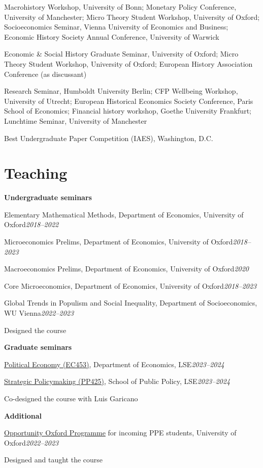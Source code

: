 \documentclass[10pt,a4paper]{article}
\newcommand{\pentry}[2]{#1\hfill\textit{#2}\par}
\newcommand{\papernote}[1]{\hspace*{1.6em}#1\par}
\newcommand{\presyear}[2]{\par\noindent\hangindent=2.1cm\hangafter=1 \makebox[2.1cm][l]{\textbf{#1}}#2\par}
\newcommand{\papergap}{\par\addvspace{8pt}}
\begin{document}
\presyear{2021}{Macrohistory Workshop, University of Bonn; Monetary Policy Conference, University of Manchester; Micro Theory Student Workshop, University of Oxford; Socioeconomics Seminar, Vienna University of Economics and Business; Economic History Society Annual Conference, University of Warwick}

\presyear{2020}{Economic \& Social History Graduate Seminar, University of Oxford; Micro Theory Student Workshop, University of Oxford; European History Association Conference (as discussant)}

\presyear{2019}{Research Seminar, Humboldt University Berlin; CFP Wellbeing Workshop, University of Utrecht; European Historical Economics Society Conference, Paris School of Economics; Financial history workshop, Goethe University Frankfurt; Lunchtime Seminar, University of Manchester}

\presyear{2016}{Best Undergraduate Paper Competition (IAES), Washington, D.C.}

\section{Teaching}

\textbf{Undergraduate seminars}\par
\pentry{Elementary Mathematical Methods, Department of Economics, University of Oxford}{2018--2022}
\pentry{Microeconomics Prelims, Department of Economics, University of Oxford}{2018--2023}
\pentry{Macroeconomics Prelims, Department of Economics, University of Oxford}{2020}
\pentry{Core Microeconomics, Department of Economics, University of Oxford}{2018--2023}
\pentry{Global Trends in Populism and Social Inequality, Department of Socioeconomics, WU Vienna}{2022--2023}
\papernote{Designed the course}
\papergap

\textbf{Graduate seminars}\par
\pentry{\href{https://www.lse.ac.uk/resources/calendar2023-2024/courseGuides/EC/2023_EC453.htm}{Political Economy (EC453)}, Department of Economics, LSE}{2023--2024}
\pentry{\href{https://www.lse.ac.uk/resources/calendar2023-2024/courseGuides/PP/2023_PP425.htm}{Strategic Policymaking (PP425)}, School of Public Policy, LSE}{2023--2024}
\papernote{Co-designed the course with Luis Garicano}
\papergap

\textbf{Additional}\par
\pentry{\href{https://www.ox.ac.uk/admissions/undergraduate/applying/opportunity-oxford}{Opportunity Oxford Programme} for incoming PPE students, University of Oxford}{2022--2023}
\papernote{Designed and taught the course}
\end{document}
